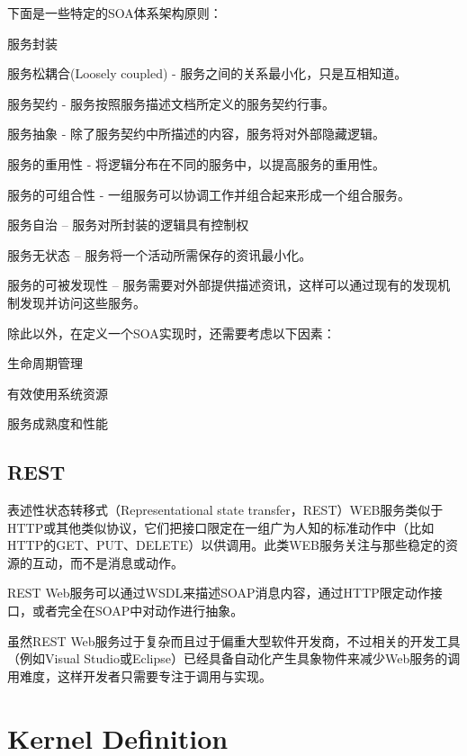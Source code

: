 下面是一些特定的SOA体系架构原则：

\begin{compactitem}
\item 服务封装
\item 服务松耦合(Loosely coupled) - 服务之间的关系最小化，只是互相知道。
\item 服务契约 - 服务按照服务描述文档所定义的服务契约行事。
\item 服务抽象 - 除了服务契约中所描述的内容，服务将对外部隐藏逻辑。
\item 服务的重用性 - 将逻辑分布在不同的服务中，以提高服务的重用性。
\item 服务的可组合性 - 一组服务可以协调工作并组合起来形成一个组合服务。
\item 服务自治 – 服务对所封装的逻辑具有控制权
\item 服务无状态 – 服务将一个活动所需保存的资讯最小化。
\item 服务的可被发现性 – 服务需要对外部提供描述资讯，这样可以通过现有的发现机制发现并访问这些服务。
\end{compactitem}

除此以外，在定义一个SOA实现时，还需要考虑以下因素：

\begin{compactitem}
\item 生命周期管理
\item 有效使用系统资源
\item 服务成熟度和性能
\end{compactitem}





\section{REST}


表述性状态转移式（Representational state transfer，REST）WEB服务类似于HTTP或其他类似协议，它们把接口限定在一组广为人知的标准动作中（比如HTTP的GET、PUT、DELETE）以供调用。此类WEB服务关注与那些稳定的资源的互动，而不是消息或动作。


REST Web服务可以通过WSDL来描述SOAP消息内容，通过HTTP限定动作接口，或者完全在SOAP中对动作进行抽象。


虽然REST Web服务过于复杂而且过于偏重大型软件开发商，不过相关的开发工具（例如Visual Studio或Eclipse）已经具备自动化产生具象物件来减少Web服务的调用难度，这样开发者只需要专注于调用与实现。



\chapter{Kernel Definition}



